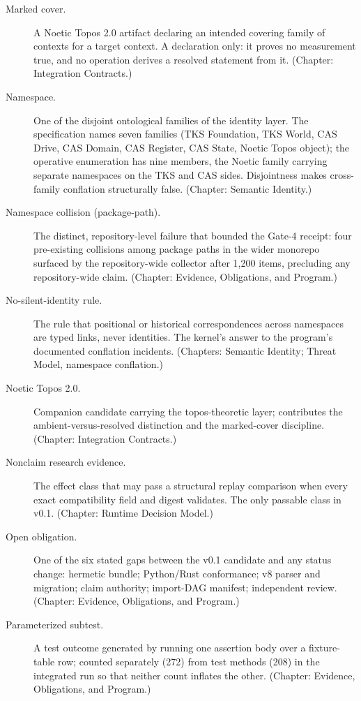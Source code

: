 \begin{description}
\item[Marked cover.] A Noetic Topos 2.0 artifact declaring an intended covering family of contexts for a target context. A declaration only: it proves no measurement true, and no operation derives a resolved statement from it. (Chapter: Integration Contracts.)

\item[Namespace.] One of the disjoint ontological families of the identity layer. The specification names seven families (TKS Foundation, TKS World, CAS Drive, CAS Domain, CAS Register, CAS State, Noetic Topos object); the operative enumeration has nine members, the Noetic family carrying separate namespaces on the TKS and CAS sides. Disjointness makes cross-family conflation structurally false. (Chapter: Semantic Identity.)

\item[Namespace collision (package-path).] The distinct, repository-level failure that bounded the Gate-4 receipt: four pre-existing collisions among package paths in the wider monorepo surfaced by the repository-wide collector after 1{,}200 items, precluding any repository-wide claim. (Chapter: Evidence, Obligations, and Program.)

\item[No-silent-identity rule.] The rule that positional or historical correspondences across namespaces are typed links, never identities. The kernel's answer to the program's documented conflation incidents. (Chapters: Semantic Identity; Threat Model, namespace conflation.)

\item[Noetic Topos 2.0.] Companion candidate carrying the topos-theoretic layer; contributes the ambient-versus-resolved distinction and the marked-cover discipline. (Chapter: Integration Contracts.)

\item[Nonclaim research evidence.] The effect class that may pass a structural replay comparison when every exact compatibility field and digest validates. The only passable class in v0.1. (Chapter: Runtime Decision Model.)

\item[Open obligation.] One of the six stated gaps between the v0.1 candidate and any status change: hermetic bundle; Python/Rust conformance; v8 parser and migration; claim authority; import-DAG manifest; independent review. (Chapter: Evidence, Obligations, and Program.)

\item[Parameterized subtest.] A test outcome generated by running one assertion body over a fixture-table row; counted separately (272) from test methods (208) in the integrated run so that neither count inflates the other. (Chapter: Evidence, Obligations, and Program.)


\end{description}
